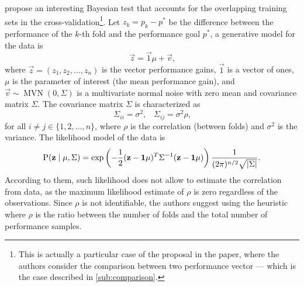 \textcite{Benavoli2017} propose an interesting Bayesian test that accounts for the
overlapping training sets in the cross-validation\footnote{%
This is actually a particular case of the proposal in the paper, where the authors
consider the comparison between two performance vector --- which is the case described in
\cref{sub:comparison}.}.
Let $z_k = p_k - p^{*}$ be the
difference between the performance of the $k$-th fold and the performance goal $p^{*}$,
a generative model for the data is
\begin{equation*}
  \vec{z} = \vec{1}\mu + \vec{v}\text{,}
\end{equation*}
where $\vec{z} = (z_1, z_2, \ldots, z_n)$ is the vector performance gains, $\vec{1}$ is a
vector of ones, $\mu$ is the parameter of interest (the mean performance gain), and
$\vec{v} \sim \operatorname{MVN}(0, \Sigma)$ is a multivariate normal noise with zero mean
and covariance matrix $\Sigma$.  The covariance matrix $\Sigma$ is characterized as
\begin{equation*}
  \Sigma_{ii} = \sigma^2\text{,}\quad
  \Sigma_{ij} = \sigma^2\rho\text{,}
\end{equation*}
for all $i \neq j \in \{1, 2, \ldots, n\}$, where $\rho$ is the correlation (between folds)
and $\sigma^2$ is the variance.  The likelihood model of the data is
\begin{equation*}
  \operatorname{P}(\mathbf{z} \mid \mu, \Sigma) =
    \exp\left(-\frac{1}{2}(\mathbf{z} - \mathbf{1}\mu)^T \Sigma^{-1} (\mathbf{z} - \mathbf{1}\mu)\right)
    \frac{1}{(2\pi)^{n/2} \sqrt{\lvert \Sigma \rvert}}\text{.}
\end{equation*}
According to them, such likelihood does not allow to estimate the correlation from data,
as the maximum likelihood estimate of $\rho$ is zero regardless of the observations.
Since $\rho$ is not identifiable, the authors suggest using the heuristic where $\rho$ is
the ratio between the number of folds and the total number of performance samples.


